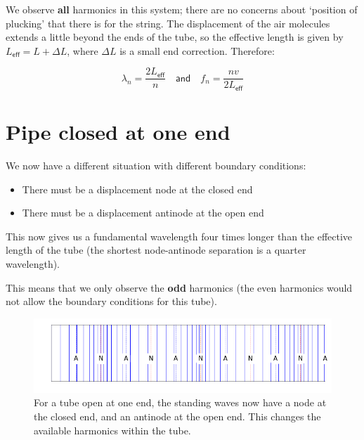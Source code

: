 \documentclass[
]{book}
\providecommand{\tightlist}{%
  \setlength{\itemsep}{0pt}\setlength{\parskip}{0pt}}
\begin{document}
We observe \textbf{all} harmonics in this system; there are no concerns about `position of plucking' that there is for the string. The displacement of the air molecules extends a little beyond the ends of the tube, so the effective length is given by \(L_\textsf{eff} = L + \Delta L\), where \(\Delta L\) is a small end correction. Therefore:

\begin{equation}
\lambda_n = \frac{2L_\textsf{eff}}{n} \quad \textsf{and} \quad f_n = \frac{nv}{2L_\textsf{eff}}
\end{equation}

\hypertarget{pipe-closed-at-one-end}{%
\section{Pipe closed at one end}\label{pipe-closed-at-one-end}}

We now have a different situation with different boundary conditions:

\begin{itemize}
\tightlist
\item
  There must be a displacement node at the closed end
\item
  There must be a displacement antinode at the open end
\end{itemize}

This now gives us a fundamental wavelength four times longer than the effective length of the tube (the shortest node-antinode separation is a quarter wavelength).

This means that we only observe the \textbf{odd} harmonics (the even harmonics would not allow the boundary conditions for this tube).

\begin{figure}

{\centering \includegraphics[width=0.7\linewidth]{visualisations/ch10-longitudinal-standingwave-n6open} 

}

\caption{For a tube open at one end, the standing waves now have a node at the closed end, and an antinode at the open end. This changes the available harmonics within the tube.}\label{fig:ch10-waves-opentube}
\end{figure}
\end{document}
